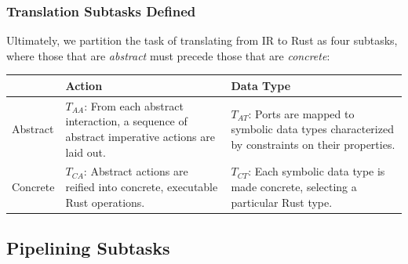 \subsubsection{Translation Subtasks Defined}

Ultimately, we partition the task of translating from IR to Rust as four subtasks, where those that are \textit{abstract} must precede those that are \textit{concrete}:

\begin{tabular}{l|p{5cm}p{5cm}}
	& Action & Data Type \\
	\hline
	Abstract & $T_{AA}$: From each abstract interaction, a sequence of abstract imperative actions are laid out. & $T_{AT}$: Ports are mapped to symbolic data types characterized by constraints on their properties. \\
	\hline
	Concrete & $T_{CA}$: Abstract actions are reified into concrete, executable Rust operations. & $T_{CT}$: Each symbolic data type is made concrete, selecting a particular Rust type.
\end{tabular}


%
%
%



\subsection{Pipelining Subtasks}
\label{sec:decoupling_reo_rust}

